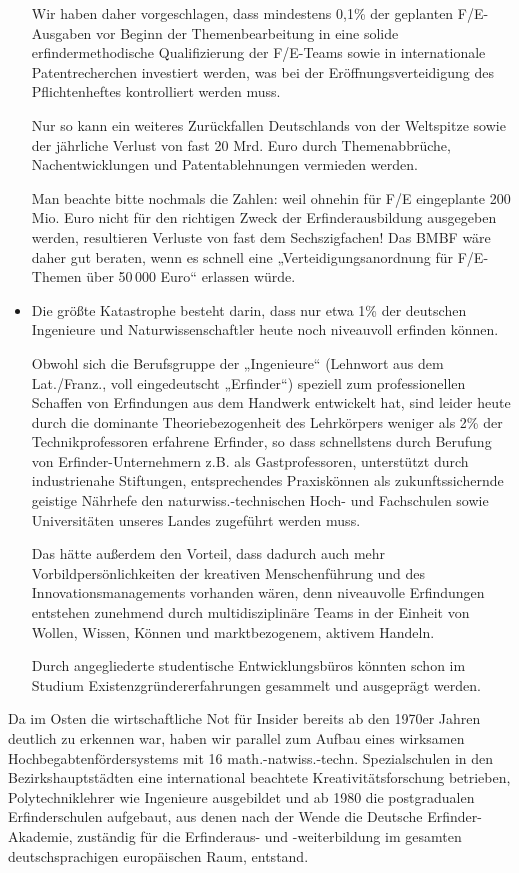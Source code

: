 \documentclass[11pt,a4paper]{article}
\begin{document}
\begin{itemize}
  Wir haben daher vorgeschlagen, dass mindestens 0{,}1\% der geplanten
  F/E-Ausgaben vor Beginn der Themenbearbeitung in eine solide
  erfindermethodische Qualifizierung der F/E-Teams sowie in internationale
  Patentrecherchen investiert werden, was bei der Eröffnungsverteidigung des
  Pflichtenheftes kontrolliert werden muss.

  Nur so kann ein weiteres Zurückfallen Deutschlands von der Weltspitze sowie
  der jähr\-liche Verlust von fast 20 Mrd. Euro durch Themenabbrüche,
  Nachentwicklungen und Patentablehnungen vermieden werden.

  Man beachte bitte nochmals die Zahlen: weil ohnehin für F/E eingeplante 200
  Mio. Euro nicht für den richtigen Zweck der Erfinderausbildung ausgegeben
  werden, resultieren Verluste von fast dem Sechszigfachen! Das BMBF wäre
  daher gut beraten, wenn es schnell eine „Verteidigungsanordnung für
  F/E-Themen über 50\,000 Euro“ erlassen würde.

\item Die größte Katastrophe besteht darin, dass nur etwa 1\% der deutschen
  Ingenieure und Naturwissenschaftler heute noch niveauvoll erfinden können.

  Obwohl sich die Berufsgruppe der „Ingenieure“ (Lehnwort aus dem Lat./Franz.,
  voll eingedeutscht „Erfinder“) speziell zum professionellen Schaffen von
  Erfindungen aus dem Handwerk entwickelt hat, sind leider heute durch die
  dominante Theoriebezogenheit des Lehrkörpers weniger als 2\% der
  Technikprofessoren erfahrene Erfinder, so dass schnellstens durch Berufung
  von Erfinder-Unternehmern z.B. als Gastprofessoren, unterstützt durch
  industrienahe Stiftungen, entsprechendes Praxiskönnen als zukunftssichernde
  geistige Nährhefe den naturwiss.-technischen Hoch- und Fachschulen sowie
  Universitäten unseres Landes zugeführt werden muss.

  Das hätte außerdem den Vorteil, dass dadurch auch mehr
  Vorbildpersönlichkeiten der kreativen Menschenführung und des
  Innovationsmanagements vorhanden wären, denn niveauvolle Erfindungen
  entstehen zunehmend durch multidisziplinäre Teams in der Einheit von Wollen,
  Wissen, Können und marktbezogenem, aktivem Handeln.

  Durch angegliederte studentische Entwicklungsbüros könnten schon im Studium
  Existenzgründererfahrungen gesammelt und ausgeprägt werden.
\end{itemize}
Da im Osten die wirtschaftliche Not für Insider bereits ab den 1970er Jahren
deutlich zu erkennen war, haben wir parallel zum Aufbau eines wirksamen
Hochbegabtenfördersystems mit 16 math.-natwiss.-techn. Spezialschulen in den
Bezirkshauptstädten eine international beachtete Kreativitätsforschung
betrieben, Polytechniklehrer wie Ingenieure ausgebildet und ab 1980 die
postgradualen Erfinderschulen aufgebaut, aus denen nach der Wende die Deutsche
Erfinder-Akademie, zuständig für die Erfinderaus- und -weiterbildung im
gesamten deutschsprachigen europäischen Raum, entstand.
\end{document}

